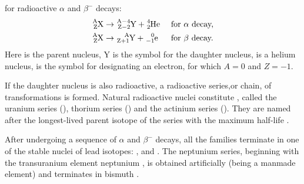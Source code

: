 \subsection{}\label{42.4.7}

 for radioactive $\alpha$ and $\beta^{-}$ decays:
\begin{align*}%
\ce{^{A}_{Z}X} & \to \ce{^{A-4}_{Z-2}Y} + \ce{^{4}_{2}He} && \text{ for } \alpha \text{ decay,}\\
\ce{^{A}_{Z}X} & \to \ce{^{A}_{Z+1}Y} + \ce{^{0}_{-1}e} && \text{ for } \beta \text{ decay.}
\end{align*}
Here  is the parent nucleus, Y is the symbol for the daughter nucleus,  is a helium nucleus,  is the symbol for designating an electron, for which $A = 0$ and $Z = -1$.


If the daughter nucleus is also radioactive, a radioactive series,or chain, of transformations is formed. Natural radioactive nuclei constitute , called the uranium series (), thorium series () and the actinium series (). They are named after the longest-lived parent isotope of the series with the maximum half-life . 

After undergoing a sequence of $\alpha$ and $\beta^{-}$ decays, all the families terminate in one of the stable nuclei of lead isotopes: ,  and . The neptunium series, beginning with the transuranium element neptunium , is obtained artificially (being a manmade element) and terminates in bismuth .


